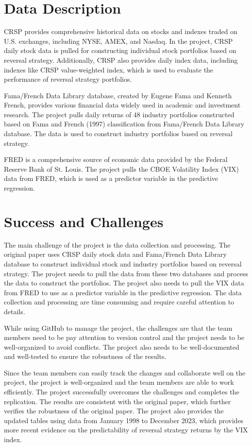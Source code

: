 \documentclass{article}
\begin{document}
\section{Data Description}
CRSP provides comprehensive historical data on stocks and indexes traded on U.S. exchanges, 
including NYSE, AMEX, and Nasdaq. In the project, CRSP daily stock data is pulled for 
constructing individual stock portfolios based on reversal strategy. Additionally, CRSP also 
provides daily index data, including indexes like CRSP value-weighted index, which is used 
to evaluate the performance of reversal strategy portfolios.

Fama/French Data Library database, created by Eugene Fama and Kenneth French, provides various 
financial data widely used in academic and investment research. The project pulls daily 
returns of 48 industry portfolios constructed based on Fama and French (1997) classification
from Fama/French Data Library database. The data is used to construct industry portfolios based
on reversal strategy.

FRED is a comprehensive source of economic data provided by the Federal Reserve Bank of St. Louis.
The project pulls the CBOE Volatility Index (VIX) data from FRED, which is used as a predictor 
variable in the predictive regression.


\section{Success and Challenges}

The main challenge of the project is the data collection and processing. The original paper uses 
CRSP daily stock data and Fama/French Data Library database to construct individual stock and 
industry portfolios based on reversal strategy. The project needs to pull the data from these two 
databases and process the data to construct the portfolios. The project also needs to pull the 
VIX data from FRED to use as a predictor variable in the predictive regression. The data collection 
and processing are time consuming and require careful attention to details.

While using GitHub to manage the project, the challenges are that the team members need to be pay 
attention to version control and the project needs to be well-organized to avoid conflicts. The
project also needs to be well-documented and well-tested to ensure the robustness of the results.

Since the team members can easily track the changes and collaborate well on the project, 
the project is well-organized and the team members are able to work efficiently. The project 
successfully overcomes the challenges and completes the replication. The results are consistent 
with the original paper, which further verifies the robustness of the original paper. The project 
also provides the updated tables using data from January 1998 to December 2023, which provides 
more recent evidence on the predictability of reversal strategy returns by the VIX index.
\end{document}
